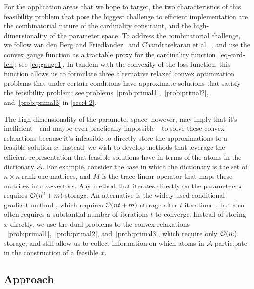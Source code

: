 For the application areas that we hope to target, the two characteristics of this feasibility problem that pose the biggest challenge to efficient implementation are the combinatorial nature of the cardinality constraint, and the high-dimensionality of the parameter space. To address the combinatorial challenge, we follow van den Berg and Friedlander~\cite{berg2008probing,berg2011sparse} and Chandrasekaran et al.~\cite{chandrasekaran2012convex}, and use the convex gauge function as a tractable proxy for the cardinality function~\eqref{eq-card-fcn}; see \eqref{eq:gauge1}. In tandem with the convexity of the loss function, this function allows us to formulate three alternative relaxed convex optimization problems that under certain conditions have approximate solutions that satisfy the feasibility problem; see problems~\eqref{prob:primal1},~\eqref{prob:primal2}, and~\eqref{prob:primal3} in \autoref{sec:4-2}. 

The high-dimensionality of the parameter space, however, may imply that it's inefficient---and maybe even practically impossible---to solve these convex relaxations because it's infeasible to directly store the approximations to a feasible solution $x$. Instead, we wish to develop methods that leverage the efficient representation that feasible solutions have in terms of the atoms in the dictionary $\mathcal{A}$. For example, consider the case in which the dictionary is the set of ${n \times n}$ rank-one matrices, and $M$ is the trace linear operator that maps these matrices into $m$-vectors. Any method that iterates directly on the parameters $x$ requires $\mathcal{O}(n^2+m)$ storage. An alternative is the widely-used conditional gradient method \cite{frank1956algorithm}, which requires $\mathcal{O}( n t+m )$ storage after $t$ iterations~\cite{jaggi2013revisiting}, but also often requires a substantial number of iterations $t$ to converge. Instead of storing $x$ directly, we use the dual problems to the convex relaxations ~\eqref{prob:primal1},~\eqref{prob:primal2}, and~\eqref{prob:primal3}, which require only $\mathcal{O}(m)$ storage, and still allow us to collect information on which atoms in $\mathcal{A}$ participate in the construction of a feasible $x$.

\subsection{Approach}

